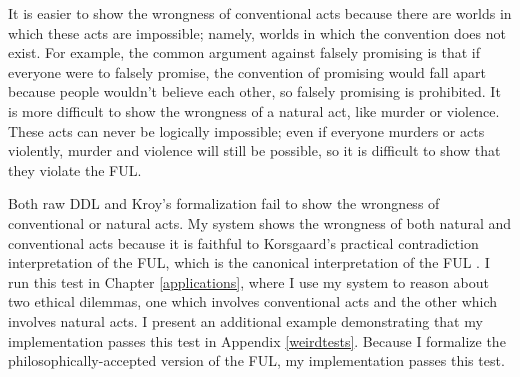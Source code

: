 \begin{isabellebody}
\begin{isamarkuptext}
It is easier to show the wrongness of conventional acts because there are worlds
in which these acts are impossible; namely, worlds in which the convention does not exist. For example, 
the common argument against falsely promising is that if everyone were to falsely promise, the convention 
of promising would fall apart because people wouldn't believe each other, so falsely promising is prohibited. 
It is more difficult to show the wrongness of a natural act, like murder or violence. These acts can 
never be logically impossible; even if everyone murders or acts violently, murder and violence will 
still be possible, so it is difficult to show that they violate the FUL. 

Both raw DDL and Kroy's formalization fail to show the wrongness of conventional or natural acts. 
My system shows the wrongness of both natural and conventional acts because it is faithful to Korsgaard's 
practical contradiction interpretation of the FUL, which is the canonical interpretation of the 
FUL \citep{ebelsduggan, KorsgaardFUL}. I run this test in Chapter \ref{applications}, where I
use my system to reason about two ethical dilemmas, one which involves conventional acts and the other which
involves natural acts. I present an additional example demonstrating that my implementation passes
this test in Appendix \ref{weirdtests}. Because I formalize the philosophically-accepted version 
of the FUL, my implementation passes this test.%
\end{isamarkuptext}\isamarkuptrue%
%
\isadelimproof
%
\endisadelimproof
%
\isatagproof
%
\endisatagproof
{\isafoldproof}%
%
\isadelimproof
%
\endisadelimproof
%
\isadelimtheory
%
\endisadelimtheory
%
\isatagtheory
%
\endisatagtheory
{\isafoldtheory}%
%
\isadelimtheory
%
\endisadelimtheory
%
\end{isabellebody}%
\endinput

